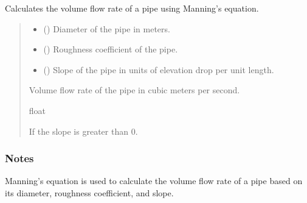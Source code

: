 \documentclass[letterpaper,10pt,english]{sphinxmanual}
\begin{document}
\begin{fulllineitems}
\label{\detokenize{pysewer:pysewer.optimization.mannings_equation}}
\pysigstartsignatures
{}
\pysigstopsignatures
\sphinxAtStartPar
Calculates the volume flow rate of a pipe using Manning’s equation.
\begin{quote}\begin{description}
\begin{itemize}
\item {} 
\sphinxAtStartPar
{} () \textendash{} Diameter of the pipe in meters.

\item {} 
\sphinxAtStartPar
{} () \textendash{} Roughness coefficient of the pipe.

\item {} 
\sphinxAtStartPar
{} () \textendash{} Slope of the pipe in units of elevation drop per unit length.

\end{itemize}

\sphinxAtStartPar
Volume flow rate of the pipe in cubic meters per second.

\sphinxAtStartPar
float

\sphinxAtStartPar
{} \textendash{} If the slope is greater than 0.

\end{description}\end{quote}
\subsubsection*{Notes}

\sphinxAtStartPar
Manning’s equation is used to calculate the volume flow rate of a pipe based on its diameter, roughness coefficient, and slope.

\end{fulllineitems}
\end{document}
